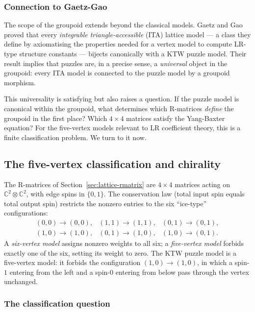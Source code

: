 \subsubsection*{Connection to Gaetz-Gao}

The scope of the groupoid extends beyond the classical models.
Gaetz and Gao~\cite{gaetz-gao-2024} proved that every
\emph{integrable triangle-accessible} (ITA) lattice model --- a class
they define by axiomatising the properties needed for a vertex model to
compute LR-type structure constants --- bijects canonically with a KTW
puzzle model.  Their result implies that puzzles are, in a precise
sense, a \emph{universal} object in the groupoid: every ITA model is
connected to the puzzle model by a groupoid morphism.

This universality is satisfying but also raises a question.  If the
puzzle model is canonical within the groupoid, what determines which
R-matrices \emph{define} the groupoid in the first place?  Which
$4 \times 4$ matrices satisfy the Yang-Baxter equation?  For the
five-vertex models relevant to LR coefficient theory, this is a finite
classification problem.  We turn to it now.


\subsection{The five-vertex classification and chirality}
\label{sec:groupoid-classification}

The R-matrices of Section~\ref{sec:lattice-rmatrix} are $4 \times 4$
matrices acting on $\mathbb{C}^2 \otimes \mathbb{C}^2$, with edge
spins in $\{0, 1\}$.  The conservation law (total input spin equals
total output spin) restricts the nonzero entries to the six
``ice-type'' configurations:
\[
  \begin{array}{cccc}
    (0,0) \to (0,0), &
    (1,1) \to (1,1), &
    (0,1) \to (0,1), \\[4pt]
    (1,0) \to (1,0), &
    (0,1) \to (1,0), &
    (1,0) \to (0,1).
  \end{array}
\]
A \emph{six-vertex model} assigns nonzero weights to all six; a
\emph{five-vertex model} forbids exactly one of the six, setting its
weight to zero.  The KTW puzzle model is a five-vertex model: it
forbids the configuration $(1,0) \to (1,0)$, in which a spin-$1$
entering from the left and a spin-$0$ entering from below pass through
the vertex unchanged.

\subsubsection*{The classification question}

